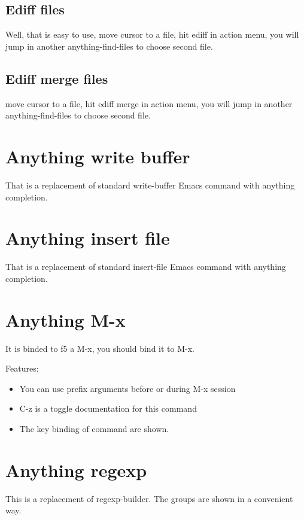 \documentclass[a4paper,11pt]{article}
\begin{document}
\subsection{Ediff files}
\label{sec:ediff-files}
Well, that is easy to use, 
move cursor to a file, hit ediff in action menu, you will jump in
another anything-find-files to choose second file.
\subsection{Ediff merge files}
\label{sec:ediff-merge-files}
move cursor to a file, hit ediff merge in action menu, you will jump in
another anything-find-files to choose second file.


\section{Anything write buffer}
\label{sec:anyth-write-buff}
That is a replacement of standard write-buffer Emacs command with anything completion.
\section{Anything insert file}
\label{sec:anything-insert-file}
That is a replacement of standard insert-file Emacs command with anything completion.

\section{Anything M-x}
\label{sec:anything-m-x}
It is binded to f5 a M-x, you should bind it to M-x.

Features:\\
\begin{itemize}
\item You can use prefix arguments before or during M-x session
\end{itemize}
\begin{itemize}
\item C-z is a toggle documentation for this command
\end{itemize}
\begin{itemize}
\item The key binding of command are shown.
\end{itemize}

\section{Anything regexp}
\label{sec:anything-regexp}
This is a replacement of regexp-builder.
The groups are shown in a convenient way.
\end{document}
